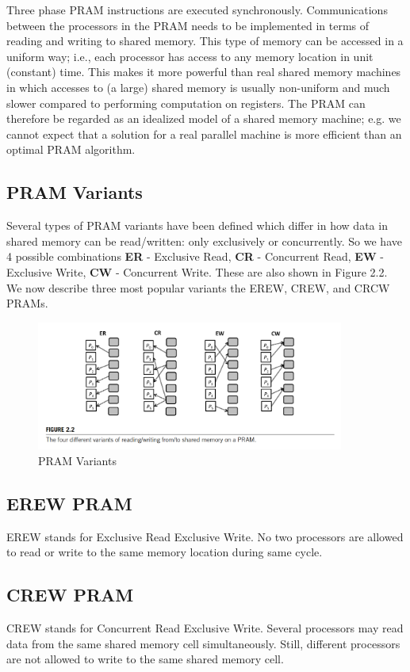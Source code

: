 Three phase PRAM instructions are executed synchronously. Communications between the processors in the PRAM needs to be implemented in terms of reading and writing to shared memory. This type of memory can be accessed in a uniform way; i.e., each processor has access to any memory location in unit (constant) time. This makes it more powerful than real shared memory machines in which accesses to (a large) shared memory is usually non-uniform and much slower compared to performing computation on registers. The PRAM can therefore be regarded as an idealized model of a shared memory machine; e.g. we cannot expect that a solution for a real parallel machine is more efficient
than an optimal PRAM algorithm.

\subsection*{PRAM Variants}
Several types of PRAM variants have been defined which differ in how data in shared memory can be read/written: only exclusively or concurrently. So we have 4 possible combinations
\textbf{ER} - Exclusive Read, \textbf{CR} - Concurrent Read, \textbf{EW} - Exclusive Write, \textbf{CW} - Concurrent Write. These are also shown in Figure 2.2.
We now describe three most popular variants the EREW, CREW, and CRCW PRAMs.

\begin{figure}[h]
    \centering
    \includegraphics[width=0.9\textwidth]{Images/PRAM2.png}
    \caption{PRAM Variants}
\end{figure}

\subsection*{EREW PRAM}
EREW stands for Exclusive Read Exclusive Write. No two processors are allowed to read or write to the same memory location during same cycle.

\subsection*{CREW PRAM}
CREW stands for Concurrent Read Exclusive Write. Several processors may read data from the same shared memory cell simultaneously. Still, different processors are not allowed to write to the same shared memory cell.

